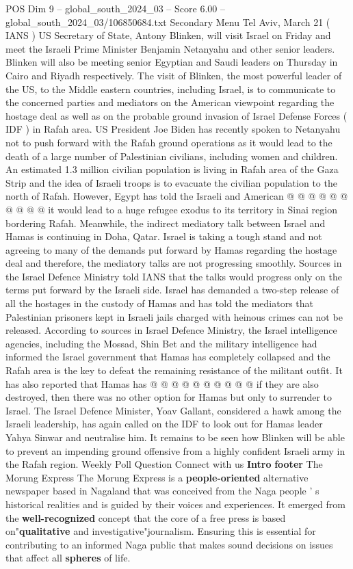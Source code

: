 \begin{textsample}{POS Dim 9 – global\_south\_2024\_03 – Score 6.00 – global\_south\_2024\_03/106850684.txt}  \label{ex:f9_pos_047}
Secondary Menu Tel Aviv, March 21 ( IANS ) US Secretary of State, Antony Blinken, will visit Israel on Friday and meet the Israeli Prime Minister Benjamin Netanyahu and other senior leaders.
Blinken will also be meeting senior Egyptian and Saudi leaders on Thursday in Cairo and Riyadh respectively.
The visit of Blinken, the most powerful leader of the US, to the Middle eastern countries, including Israel, is to communicate to the concerned parties and mediators on the American viewpoint regarding the hostage deal as well as on the probable ground invasion of Israel Defense Forces ( IDF ) in Rafah area.
US President Joe Biden has recently spoken to Netanyahu not to push forward with the Rafah ground operations as it would lead to the death of a large number of Palestinian civilians, including women and children.
An estimated 1.3 million civilian population is living in Rafah area of the Gaza Strip and the idea of Israeli troops is to evacuate the civilian population to the north of Rafah.
However, Egypt has told the Israeli and American @ @ @ @ @ @ @ @ @ @ it would lead to a huge refugee exodus to its territory in Sinai region bordering Rafah.
Meanwhile, the indirect mediatory talk between Israel and Hamas is continuing in Doha, Qatar.
Israel is taking a tough stand and not agreeing to many of the demands put forward by Hamas regarding the hostage deal and therefore, the mediatory talks are not progressing smoothly.
Sources in the Israel Defence Ministry told IANS that the talks would progress only on the terms put forward by the Israeli side.
Israel has demanded a two-step release of all the hostages in the custody of Hamas and has told the mediators that Palestinian prisoners kept in Israeli jails charged with heinous crimes can not be released.
According to sources in Israel Defence Ministry, the Israel intelligence agencies, including the Mossad, Shin Bet and the military intelligence had informed the Israel government that Hamas has completely collapsed and the Rafah area is the key to defeat the remaining resistance of the militant outfit.
It has also reported that Hamas has @ @ @ @ @ @ @ @ @ @ if they are also destroyed, then there was no other option for Hamas but only to surrender to Israel.
The Israel Defence Minister, Yoav Gallant, considered a hawk among the Israeli leadership, has again called on the IDF to look out for Hamas leader Yahya Sinwar and neutralise him.
It remains to be seen how Blinken will be able to prevent an impending ground offensive from a highly confident Israeli army in the Rafah region.
Weekly Poll Question Connect with us \textbf{Intro} \textbf{footer} The Morung Express The Morung Express is a \textbf{people-oriented} alternative newspaper based in Nagaland that was conceived from the Naga people ' s historical realities and is guided by their voices and experiences.
It emerged from the \textbf{well-recognized} concept that the core of a free press is based on"\textbf{qualitative} and investigative"journalism.
Ensuring this is essential for contributing to an informed Naga public that makes sound decisions on issues that affect all \textbf{spheres} of life.


\end{textsample}
